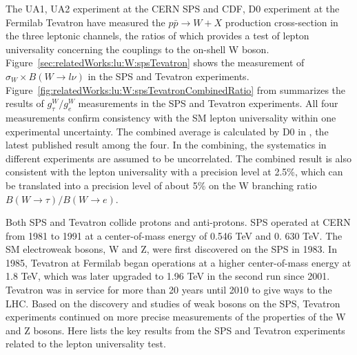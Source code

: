 The UA1, UA2 experiment at the CERN SPS and CDF, D0 experiment at the Fermilab Tevatron have measured the $p\bar{p} \to W + X$ production cross-section in the three leptonic channels, the ratios of which provides a test of lepton universality concerning the couplings to the on-shell W boson. Figure~\ref{sec:relatedWorks:lu:W:spsTevatron} shows the measurement of $\sigma_W \times B(W\to l \nu)$ in the SPS and Tevatron experiments.  Figure~\ref{fig:relatedWorks:lu:W:spsTevatronCombinedRatio} from \cite{Abbott:1999pk} summarizes the results of $g^W_\tau / g^W_e$ measurements in the SPS and Tevatron experiments. All four measurements confirm consistency with the SM lepton universality within one experimental uncertainty. The combined average is calculated by D0 in \cite{Abbott:1999pk}, the latest published result among the four. In the combining, the systematics in different experiments are assumed to be uncorrelated. The combined result is also consistent with the lepton universality with a precision level at 2.5\%, which can be translated into a precision level of about  5\% on the W branching ratio $B(W\to \tau) / B(W\to e)$.

Both SPS and Tevatron collide protons and anti-protons. SPS operated at CERN from 1981 to 1991 at a center-of-mass energy of 0.546 TeV and 0. 630 TeV. The SM electroweak bosons, W and Z, were first discovered on the SPS in 1983. In 1985, Tevatron at Fermilab began operations at a higher center-of-mass energy at 1.8 TeV, which was later upgraded to 1.96 TeV in the second run since 2001. Tevatron was in service for more than 20 years until 2010 to give ways to the LHC. Based on the discovery and studies of weak bosons on the SPS, Tevatron experiments continued on more precise measurements of the properties of the W and Z bosons. Here lists the key results from the SPS and Tevatron experiments  related to the lepton universality test.




